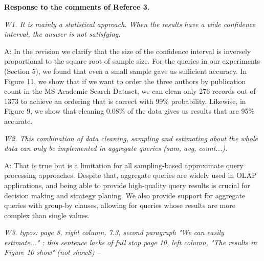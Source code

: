 


\vspace{1em}

{\noindent \bf Response to the comments of Referee 3.}

\vspace{1em}


\emph{W1. It is mainly a statistical approach. When the results have a wide confidence interval, the answer is not satisfying.}

A: 
%
%
In the revision we clarify that the size of the confidence interval is inversely proportional to the square root of sample size. 
For the queries in our experiments (Section 5), we found that even a small sample gave us sufficient accuracy. In Figure 11, we show that if we want to order the three authors by publication count in the MS Academic Search Dataset, we can clean only 276 records out of 1373 to achieve an ordering that is correct with 99\% probability. Likewise, in Figure 9, we show that cleaning 0.08\% of the data gives us results that are 95\% accurate. %

\mbox{}

\emph{W2. This combination of data cleaning, sampling and estimating about the whole data can only be implemented in aggregate queries (sum, avg, count...). }

A: That is true but is a limitation for all sampling-based approximate query processing approaches. Despite that, aggregate queries are widely used in OLAP applications, and being able to provide high-quality query results is crucial for decision making and strategy planing. We also provide support for aggregate queries with group-by clauses, allowing for queries whose results are more complex than single values.

\mbox{}


\emph{W3. typos: page 8, right column, 7.3, second paragraph "We can easily estimate..." : this sentence lacks of full stop
page 10, left column, "The results in Figure 10 show" (not showS) --}


